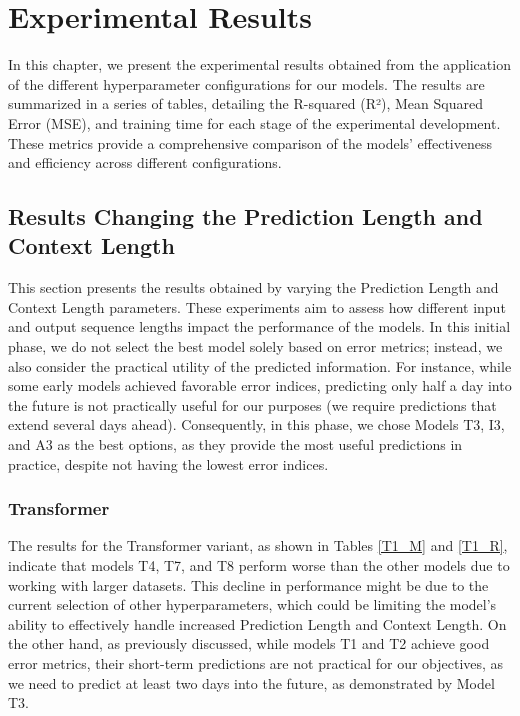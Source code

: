 \chapter{Experimental Results}
In this chapter, we present the experimental results obtained from the application of the different hyperparameter configurations for our models. The results are summarized in a series of tables, detailing the R-squared (R²), Mean Squared Error (MSE), and training time for each stage of the experimental development. These metrics provide a comprehensive comparison of the models' effectiveness and efficiency across different configurations.

\section{Results Changing the Prediction Length and Context Length}
This section presents the results obtained by varying the Prediction Length and Context Length parameters. These experiments aim to assess how different input and output sequence lengths impact the performance of the models.
In this initial phase, we do not select the best model solely based on error metrics; instead, we also consider the practical utility of the predicted information. For instance, while some early models achieved favorable error indices, predicting only half a day into the future is not practically useful for our purposes (we require predictions that extend several days ahead). Consequently, in this phase, we chose Models T3, I3, and A3 as the best options, as they provide the most useful predictions in practice, despite not having the lowest error indices.

\subsection{Transformer}
The results for the Transformer variant, as shown in Tables \ref{T1_M} and \ref{T1_R}, indicate that models T4, T7, and T8 perform worse than the other models due to working with larger datasets. This decline in performance might be due to the current selection of other hyperparameters, which could be limiting the model's ability to effectively handle increased Prediction Length and Context Length. On the other hand, as previously discussed, while models T1 and T2 achieve good error metrics, their short-term predictions are not practical for our objectives, as we need to predict at least two days into the future, as demonstrated by Model T3.

